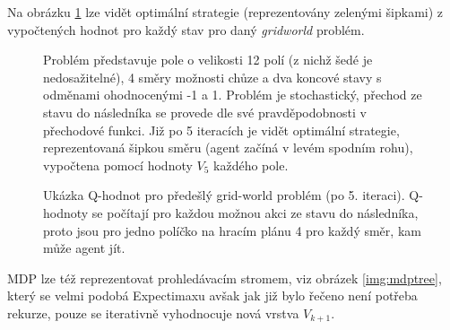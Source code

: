 Na obrázku \ref{img:policy} lze vidět optimální strategie (reprezentovány zelenými šipkami) z vypočtených hodnot pro každý stav pro daný \textit{gridworld} problém.

\begin{figure}[!htbp]
\begin{center}
  \caption{Problém představuje pole o velikosti 12 polí (z nichž šedé je nedosažitelné), 4 směry možnosti chůze a dva koncové stavy s odměnami ohodnocenými -1 a 1. Problém je stochastický, přechod ze stavu do následníka se provede dle své pravděpodobnosti v přechodové funkci. Již po 5 iteracích je vidět optimální strategie, reprezentovaná šipkou směru (agent začíná v levém spodním rohu), vypočtena pomocí hodnoty $V_{5}$ každého pole.}
  \label{img:policy}
\end{center}
\end{figure}

\begin{figure}[!htbp]
\begin{center}
  \caption{Ukázka Q-hodnot pro předešlý grid-world problém (po 5. iteraci). Q-hodnoty se počítají pro každou možnou akci ze stavu do následníka, proto jsou pro jedno políčko na hracím plánu 4 pro každý směr, kam může agent jít.}
  \label{img:qvals}
\end{center}
\end{figure}
MDP lze též reprezentovat prohledávacím stromem, viz obrázek \ref{img:mdptree}, který se velmi podobá Expectimaxu avšak jak již bylo řečeno není potřeba rekurze, pouze se iterativně vyhodnocuje nová vrstva $V_{k+1}$.

